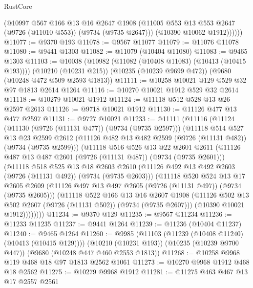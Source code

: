 \begin{lexlean}{RustCore}
\begin{coremodule}
            (@10997
              @567
              @166
              @13
              @16
              @2647
              @1908
              (@11005 @553 @13 @553 @2647 (@9726 (@11010 @553)) (@9734 (@9735 @2647)))
              (@10390 @10062 @1912))))))
@11077 := @9370 @193
@11078 := @9567 @11077
@11079 := @11076 @11078
@11080 := @9441 @1303
@11082 := @11079 (@10404 @11080)
@11083 := @9465 @1303
@11103 := @10038
    (@10982 (@11082 (@10408 @11083) (@10413 (@10415 @193))))
    (@10210 (@10231 @215))
    (@10235 (@10239 @9699 @472))
    (@9680 (@10248 @472 @509 @2593 @1813))
@11111 := @10258 @10021 @129 @529 @32 @97 @1813 @2614 @1264
@11116 := @10270 @10021 @1912 @529 @32 @2614
@11118 := @10279 @10021 @1912
@11124 := @11118 @512 @528 @13 @26 @2597 @2613
@11126 := @9718 @10021 @1912
@11130 := @11126 @477 @13 @477 @2597
@11131 := @9727 @10021
@11233 := @11111
    (@11116
      (@11124
        (@11130 (@9726 (@11131 @477)) (@9734 (@9735 @2597)))
        (@11118
          @514
          @527
          @13
          @23
          @2599
          @2612
          (@11126 @482 @13 @482 @2599 (@9726 (@11131 @482)) (@9734 (@9735 @2599)))
          (@11118
            @516
            @526
            @13
            @22
            @2601
            @2611
            (@11126 @487 @13 @487 @2601 (@9726 (@11131 @487)) (@9734 (@9735 @2601)))
            (@11118
              @518
              @525
              @13
              @18
              @2603
              @2610
              (@11126 @492 @13 @492 @2603 (@9726 (@11131 @492)) (@9734 (@9735 @2603)))
              (@11118
                @520
                @524
                @13
                @17
                @2605
                @2609
                (@11126 @497 @13 @497 @2605 (@9726 (@11131 @497)) (@9734 (@9735 @2605)))
                (@11118
                  @522
                  @166
                  @13
                  @16
                  @2607
                  @1908
                  (@11126 @502 @13 @502 @2607 (@9726 (@11131 @502)) (@9734 (@9735 @2607)))
                  (@10390 @10021 @1912))))))))
@11234 := @9370 @129
@11235 := @9567 @11234
@11236 := @11233 @11235
@11237 := @9441 @1264
@11239 := @11236 (@10404 @11237)
@11240 := @9465 @1264
@11260 := @9985
    (@11103 (@11239 (@10408 @11240) (@10413 (@10415 @129))))
    (@10210 (@10231 @193))
    (@10235 (@10239 @9700 @447))
    (@9680 (@10248 @447 @460 @2553 @1813))
@11268 := @10258 @9968 @119 @468 @18 @97 @1813 @2562 @1061
@11273 := @10270 @9968 @1912 @468 @18 @2562
@11275 := @10279 @9968 @1912
@11281 := @11275 @463 @467 @13 @17 @2557 @2561

\end{coremodule}
\end{lexlean}
